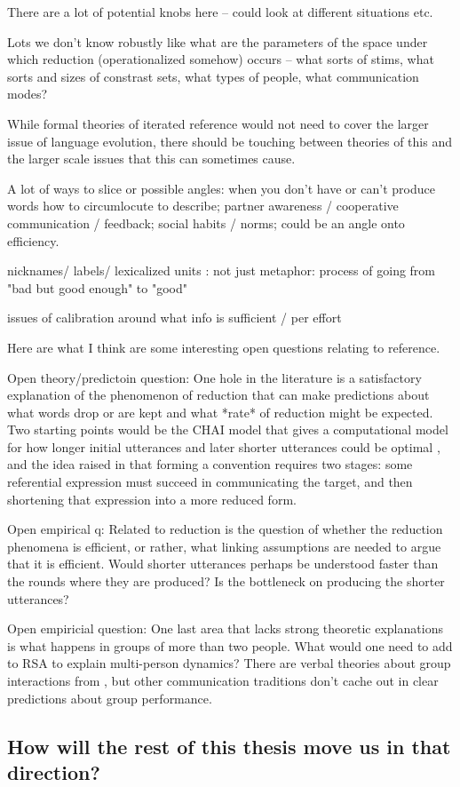 \documentclass[]{article}
\begin{document}
	There are a lot of potential knobs here -- could look at different situations etc. 
	
	Lots we don't know robustly like what are the parameters of the space under which reduction (operationalized somehow) occurs -- what sorts of stims, what sorts and sizes of constrast sets, what types of people, what communication modes? 
	
	While formal theories of iterated reference would not need to cover the larger issue of language evolution, there should be touching between theories of this and the larger scale issues that this can sometimes cause. 
	
	A lot of ways to slice or possible angles: when you don't have or can't produce words how to circumlocute to describe; partner awareness / cooperative communication / feedback; social habits / norms; could be an angle onto efficiency. 
	
	nicknames/ labels/ lexicalized units : not just metaphor: process of going from "bad but good enough" to "good"
	
	issues of calibration around what info is sufficient / per effort 
	
	Here are what I think are some interesting open questions relating to reference. 
	
	Open theory/predictoin question: One hole in the literature is a satisfactory explanation of the phenomenon of reduction that can make predictions about what words drop or are kept and what *rate* of reduction might be expected. Two starting points would be the CHAI model that gives a computational model for how longer initial utterances and later shorter utterances could be optimal \cite{hawkins2021}, and the idea raised in \cite{leung2023} that forming a convention requires two stages: some referential expression must succeed in communicating the target, and then shortening that expression into a more reduced form.
	
	Open empirical q: Related to reduction is the question of whether the reduction phenomena is efficient, or rather, what linking assumptions are needed to argue that it is efficient. Would shorter utterances perhaps be understood faster than the rounds where they are produced? Is the bottleneck on producing the shorter utterances? 
	
	Open empiricial question: One last area that lacks strong theoretic explanations is what happens in groups of more than two people. What would one need to add to RSA to explain multi-person dynamics? There are verbal theories about group interactions from \cite{yoon2018}, but other communication traditions don't cache out in clear predictions about group performance. 
	

	\subsection{How will the rest of this thesis move us in that direction?}
\end{document}
